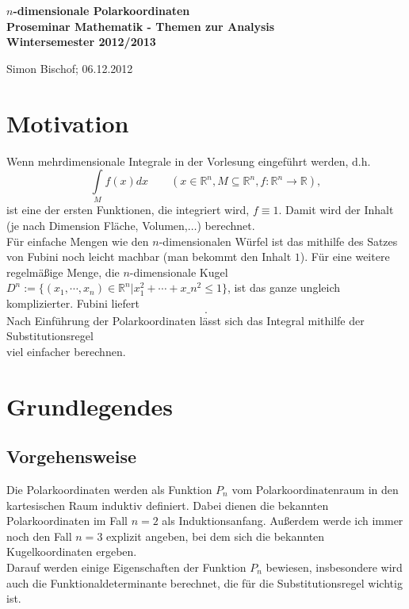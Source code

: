 \documentclass[a4paper,11pt]{report}
\theoremstyle{definition}
\newcommand{\R}{{\ensuremath{\mathbb{R}}}}
\newcommand{\const}{\ensuremath{\equiv}}
\begin{document}
\begin{titlepage}
	\begin{center}	
		\LARGE \textbf{$n$-dimensionale Polarkoordinaten \\[5ex]
			{\Large Proseminar Mathematik - Themen zur Analysis \\[5ex] 
    		Wintersemester 2012/2013}\\[5ex]}
	\end{center}
	\begin{center}
		Simon Bischof; 06.12.2012 %
	\end{center}
\end{titlepage}
\clearpage{}
\setcounter{tocdepth}{1}

\clearpage{}
\chapter{Motivation}
Wenn mehrdimensionale Integrale in der Vorlesung eingeführt werden, d.h.
$$\int\limits_M f(x)dx \qquad (x\in\R^n,M\subseteq \R^n, f:\R^n\to\R),$$ %
ist eine der ersten Funktionen, die integriert wird, $f\const 1$. Damit wird der Inhalt (je nach Dimension Fläche, Volumen,$\ldots$) berechnet.\\
Für einfache Mengen wie den $n$-dimensionalen Würfel %
ist das mithilfe des Satzes von Fubini noch leicht machbar (man bekommt den Inhalt $1$). Für eine weitere regelmäßige Menge, die $n$-dimensionale Kugel $D^n:=\{(x_1,\cdots,x_n)\in\R^n|x_1^2+\cdots+x\_n^2\leq 1\}$, ist das ganze ungleich komplizierter. Fubini liefert
$$.$$%
Nach Einführung der Polarkoordinaten lässt sich das Integral mithilfe der Substitutionsregel
$$$$%
viel einfacher berechnen.
\chapter{Grundlegendes}
\section{Vorgehensweise}
Die Polarkoordinaten werden als Funktion $P_n$ vom \glqq Polarkoordinatenraum\grqq{} in den kartesischen Raum induktiv definiert. Dabei dienen die bekannten Polarkoordinaten im Fall $n=2$ als Induktionsanfang. Außerdem werde ich immer noch den Fall $n=3$ explizit angeben, bei dem sich die bekannten Kugelkoordinaten ergeben.\\
Darauf werden einige Eigenschaften der Funktion $P_n$ bewiesen, insbesondere wird auch die Funktionaldeterminante berechnet, die für die Substitutionsregel %
wichtig ist.
\end{document}
